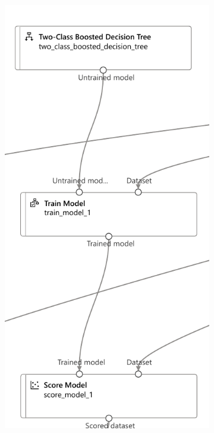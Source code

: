 \begin{figure}[H]
\begin{subfigure}[m]{0.3\textwidth}
        \includegraphics[width=\textwidth]{images/dt_pipe}
        \label{fig:dt-pipe}

\end{subfigure}
\end{figure}
